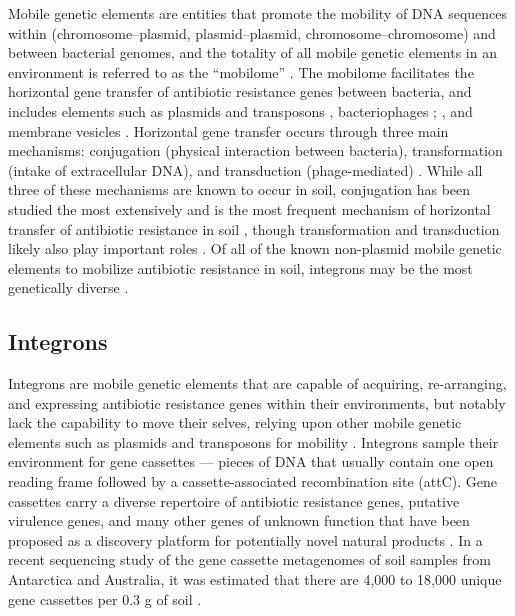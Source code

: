 Mobile genetic elements are entities that promote the mobility of DNA sequences within (chromosome–plasmid, plasmid–plasmid, chromosome–chromosome) and between bacterial genomes, and the totality of all mobile genetic elements in an environment is referred to as the “mobilome” \parencite{Partridge.2018, Perry.2013}.
The mobilome facilitates the horizontal gene transfer of antibiotic resistance genes between bacteria, and includes elements such as plasmids and transposons \parencite{Partridge.2018}, bacteriophages \parencite{Subirats.2016}; \parencite{ColomerLluch.2011}, and membrane vesicles \parencite{Chattopadhyay.2015}.
Horizontal gene transfer occurs through three main mechanisms: conjugation (physical interaction between bacteria), transformation (intake of extracellular DNA), and transduction (phage-mediated) \parencite{Partridge.2018}.
While all three of these mechanisms are known to occur in soil, conjugation has been studied the most extensively and is the most frequent mechanism of horizontal transfer of antibiotic resistance in soil \parencite{Perry.2013}, though transformation and transduction likely also play important roles \parencite{Perry.2013, Aminov.2011}.
Of all of the known non-plasmid mobile genetic elements to mobilize antibiotic resistance in soil, integrons may be the most genetically diverse \parencite{Ghaly.2019}.

\subsection{Integrons}

Integrons are mobile genetic elements that are capable of acquiring, re-arranging, and expressing antibiotic resistance genes within their environments, but notably lack the capability to move their selves, relying upon other mobile genetic elements such as plasmids and transposons for mobility \parencite{Gillings.2014}.
Integrons sample their environment for gene cassettes \parencite{Ghaly.2020} --- pieces of DNA that usually contain one open reading frame followed by a cassette-associated recombination site (attC).
Gene cassettes carry a diverse repertoire of antibiotic resistance genes, putative virulence genes, and many other genes of unknown function that have been proposed as a discovery platform for potentially novel natural products \parencite{Ma.2017, Ghaly.2019, Ghaly.2020}.
In a recent sequencing study of the gene cassette metagenomes of soil samples from Antarctica and Australia, it was estimated that there are 4,000 to 18,000 unique gene cassettes per 0.3 g of soil \parencite{Ghaly.2019}.

